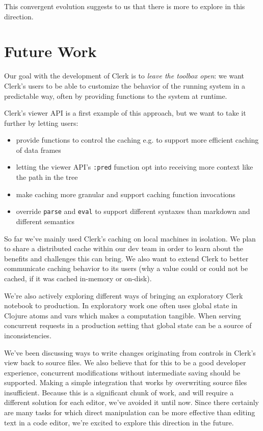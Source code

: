 \documentclass[sigconf,screen]{acmart}
\newcommand{\passthrough}[1]{#1}
\providecommand{\tightlist}{%
  \setlength{\itemsep}{0pt}\setlength{\parskip}{0pt}}
\begin{document}
This convergent evolution suggests to us that there is more to explore in this direction.

\hypertarget{id}{%
\section{Future Work}\label{id}}

Our goal with the development of Clerk is to \emph{leave the toolbox open}: we want Clerk's users to be able to customize the behavior of the running system in a predictable way, often by providing functions to the system at runtime.

Clerk's viewer API is a first example of this approach, but we want to take it further by letting users:

\begin{itemize}
\tightlist
\item
  provide functions to control the caching e.g. to support more efficient caching of data frames
\item
  letting the viewer API's \passthrough{\lstinline!:pred!} function opt into receiving more context like the path in the tree
\item
  make caching more granular and support caching function invocations
\item
  override \passthrough{\lstinline!parse!} and \passthrough{\lstinline!eval!} to support different syntaxes than markdown and different semantics
\end{itemize}

So far we've mainly used Clerk's caching on local machines in isolation. We plan to share a distributed cache within our dev team in order to learn about the benefits and challenges this can bring. We also want to extend Clerk to better communicate caching behavior to its users (why a value could or could not be cached, if it was cached in-memory or on-disk).

We're also actively exploring different ways of bringing an exploratory Clerk notebook to production. In exploratory work one often uses global state in Clojure atoms and vars which makes a computation tangible. When serving concurrent requests in a production setting that global state can be a source of inconsistencies.

We've been discussing ways to write changes originating from controls in Clerk's view back to source files. We also believe that for this to be a good developer experience, concurrent modifications without intermediate saving should be supported. Making a simple integration that works by overwriting source files insufficient. Because this is a significant chunk of work, and will require a different solution for each editor, we've avoided it until now. Since there certainly are many tasks for which direct manipulation can be more effective than editing text in a code editor, we're excited to explore this direction in the future.
\end{document}
